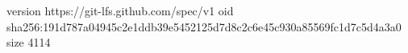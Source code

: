 version https://git-lfs.github.com/spec/v1
oid sha256:191d787a04945c2e1ddb39e5452125d7d8c2c6e45c930a85569fc1d7c5d4a3a0
size 4114
